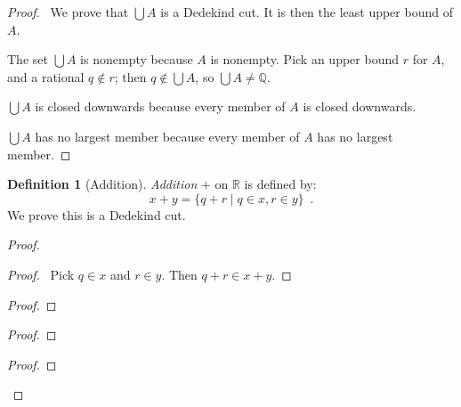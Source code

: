 \documentclass{article}
\let\qed\relax
\theoremstyle{definition}
\newtheorem{definition}[axiom]{Definition}
\begin{document}
    \begin{proof}
        \pf\ We prove that $\bigcup A$ is a Dedekind cut. It is then the least upper bound of $A$.

        The set $\bigcup A$ is nonempty because $A$ is nonempty. Pick an upper bound $r$ for $A$, and a
        rational $q \notin r$; then $q \notin \bigcup A$, so $\bigcup A \neq \mathbb{Q}$.

        $\bigcup A$ is closed downwards because every member of $A$ is closed downwards.

        $\bigcup A$ has no largest member because every member of $A$ has no largest member. \qed
    \end{proof}

    \begin{definition}[Addition]
        \emph{Addition} $+$ on $\mathbb{R}$ is defined by:
        \[ x + y = \{ q + r \mid q \in x, r \in y \} \enspace .\]
        We prove this is a Dedekind cut.
    \end{definition}

    \begin{proof}
        \pf
        \begin{proof}
            \pf\ Pick $q \in x$ and $r \in y$. Then $q + r \in x + y$.
        \end{proof}
        \begin{proof}
        \end{proof}
        \begin{proof}
        \end{proof}
        \begin{proof}
        \end{proof}
        \qed
    \end{proof}
\end{document}
